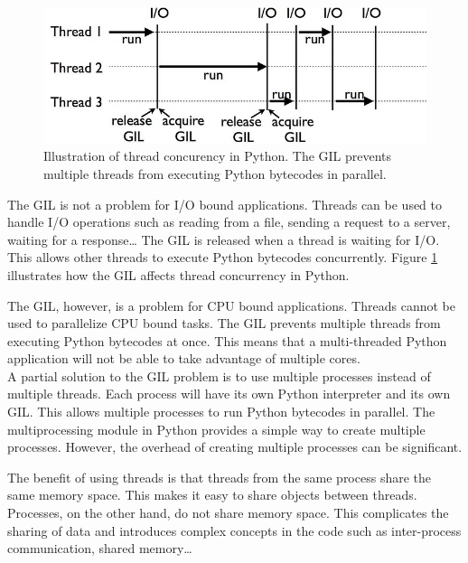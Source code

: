 \begin{spacing}{1.2}
    \begin{figure}
        \centering
        \includegraphics[width=\textwidth]{Chapitre4/figures/gil.png}
        \caption{Illustration of thread concurency in Python. The GIL prevents
         multiple threads from executing Python bytecodes in parallel.}
        \label{fig:gil}
    \end{figure}

    The GIL is not a problem for I/O bound applications. Threads can be used to handle I/O operations
    such as reading from a file, sending a request to a server, waiting for a response\dots
    The GIL is released when a thread is waiting for I/O. This allows other threads to execute Python
    bytecodes concurrently. Figure \ref{fig:gil} illustrates how the GIL affects thread concurrency in Python.


    The GIL, however, is a problem for CPU bound applications. Threads cannot be used to parallelize
    CPU bound tasks. The GIL prevents multiple threads from executing Python bytecodes at once. 
    This means that a multi-threaded Python application will not be able to take advantage of multiple
    cores.\\ 

    A partial solution to the GIL problem is to use multiple processes instead of multiple threads.
    Each process will have its own Python interpreter and its own GIL. This allows multiple processes
    to run Python bytecodes in parallel. The multiprocessing module in Python provides a simple way
    to create multiple processes. However, the overhead of creating multiple processes can be significant.


    The benefit of using threads 
    is that threads from the same process share the same memory space. This makes it easy to share objects
    between threads. Processes, on the other hand, do not share memory space. This complicates the sharing
    of data and introduces complex concepts in the code such as inter-process communication, shared memory\dots\\


\end{spacing}
